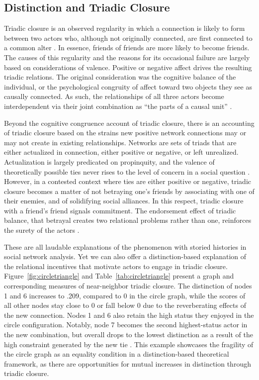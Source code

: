 \documentclass[12pt]{article}
\begin{document}
\subsection{Distinction and Triadic Closure}
Triadic closure is an observed regularity in which a connection is likely to form between two actors who, although not originally connected, are first connected to a common alter \citep{simmel1950sociology-c96}. In essence, friends of friends are more likely to become friends. The causes of this regularity and the reasons for its occasional failure are largely based on considerations of valence. Positive or negative affect drives the resulting triadic relations. The original consideration was the cognitive balance of the individual, or the psychological congruity of affect toward two objects they see as causally connected. As such, the relationships of all three actors become interdependent via their joint combination as ``the parts of a causal unit'' \citep[107]{heider1946attitudes-ff3}.

Beyond the cognitive congruence account of triadic closure, there is an accounting of triadic closure based on the strains new positive network connections may or may not create in existing relationships. Networks are sets of triads that are either actualized in connection, either positive or negative, or left unrealized. Actualization is largely predicated on propinquity, and the valence of theoretically possible ties never rises to the level of concern in a social question \citep{feld1981focused, feld1982social, mollenhorst2011shared}. However, in a contested context where ties are either positive or negative, triadic closure becomes a matter of not betraying one's friends by associating with one of their enemies, and of solidifying social alliances. In this respect, triadic closure with a friend's friend signals commitment. The endorsement effect of triadic balance, that betrayal creates two relational problems rather than one, reinforces the surety of the actors \citep{yoon2013exchange}. 

These are all laudable explanations of the phenomenon with storied histories in social network analysis. Yet we can also offer a distinction-based explanation of the relational incentives that motivate actors to engage in triadic closure. Figure~\ref{fig:circletriangle} and Table~\ref{tab:circletriangle} present a graph and corresponding measures of near-neighbor triadic closure. The distinction of nodes 1 and 6 increases to .209, compared to 0 in the circle graph, while the scores of all other nodes stay close to 0 or fall below 0 due to the reverberating effects of the new connection. Nodes 1 and 6 also retain the high status they enjoyed in the circle configuration. Notably, node 7 becomes the second highest-status actor in the new combination, but overall drops to the lowest distinction as a result of the high constraint generated by the new tie \citep{krackhardt1998simmelian-58f}. This example showcases the fragility of the circle graph as an equality condition in a distinction-based theoretical framework, as there are opportunities for mutual increases in distinction through triadic closure. 
\end{document}
